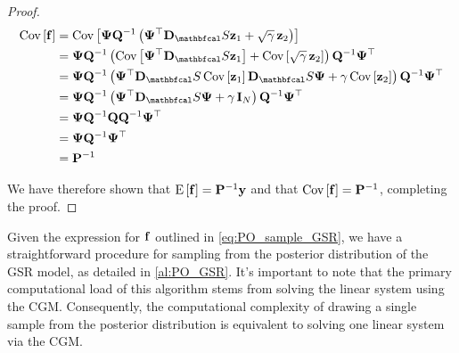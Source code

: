 \begin{proof}
    \begin{align*}
        \text{Cov}\left[\f\right] &= \text{Cov}\left[\PSI \Q^{-1} \left(\PSI^\top \D_\St \z_1 + \sqrt{\gamma} \, \z_2\right)\right]  \\
        &= \PSI \Q^{-1} \left(\text{Cov}\left[ \PSI^\top \D_\St \z_1 \right] + \text{Cov}\left[\sqrt{\gamma} \,  \z_2\right]\right) \Q^{-1} \PSI^\top \\
        &= \PSI \Q^{-1} \left(\PSI^\top \D_\St \, \text{Cov}\left[  \z_1 \right] \D_\St \PSI + \gamma \, \text{Cov}\left[ \z_2\right]\right) \Q^{-1} \PSI^\top  \\
        &= \PSI \Q^{-1} \left(\PSI^\top \D_\St \PSI + \gamma \, \I_N \right) \Q^{-1} \PSI^\top  \\
        &= \PSI \Q^{-1} \Q \Q^{-1} \PSI^\top \\
        &= \PSI \Q^{-1} \PSI^\top \\
        &= \PP^{-1}
    \end{align*}

    We have therefore shown that $\text{E}\left[\mathbf{f}\right] = \mathbf{P}^{-1} \mathbf{y}$ and that $\text{Cov}\left[\mathbf{f}\right] = \mathbf{P}^{-1}$, completing the proof. 

\end{proof}

Given the expression for $\mathbf{f}$ outlined in \cref{eq:PO_sample_GSR}, we have a straightforward procedure for sampling from the posterior distribution of the GSR model, as detailed in \cref{al:PO_GSR}. It's important to note that the primary computational load of this algorithm stems from solving the linear system using the CGM. Consequently, the computational complexity of drawing a single sample from the posterior distribution is equivalent to solving one linear system via the CGM.

\vspace{0.5cm}


